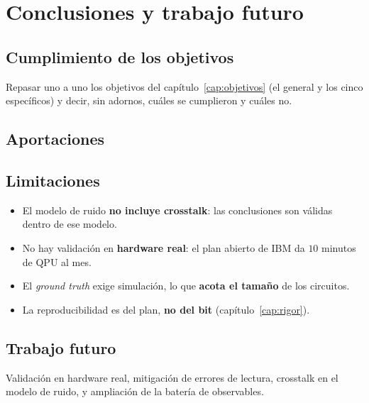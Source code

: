 \chapter{Conclusiones y trabajo futuro}
\label{cap:conclusiones}

%

\section{Cumplimiento de los objetivos}
\label{sec:cumplimiento}
Repasar uno a uno los objetivos del capítulo~\ref{cap:objetivos} (el general y los cinco
específicos) y decir, sin adornos, cuáles se cumplieron y cuáles no.

\section{Aportaciones}
\label{sec:aportaciones}

\section{Limitaciones}
\label{sec:limitaciones_finales}
\begin{itemize}
    \item El modelo de ruido \textbf{no incluye crosstalk}: las conclusiones son válidas
          dentro de ese modelo.
    \item No hay validación en \textbf{hardware real}: el plan abierto de IBM da $10$ minutos
          de QPU al mes.
    \item El \textit{ground truth} exige simulación, lo que \textbf{acota el tamaño} de los
          circuitos.
    \item La reproducibilidad es del plan, \textbf{no del bit}
          (capítulo~\ref{cap:rigor}).
\end{itemize}

\section{Trabajo futuro}
\label{sec:futuro}
Validación en hardware real, mitigación de errores de lectura, crosstalk en el modelo de
ruido, y ampliación de la batería de observables.
